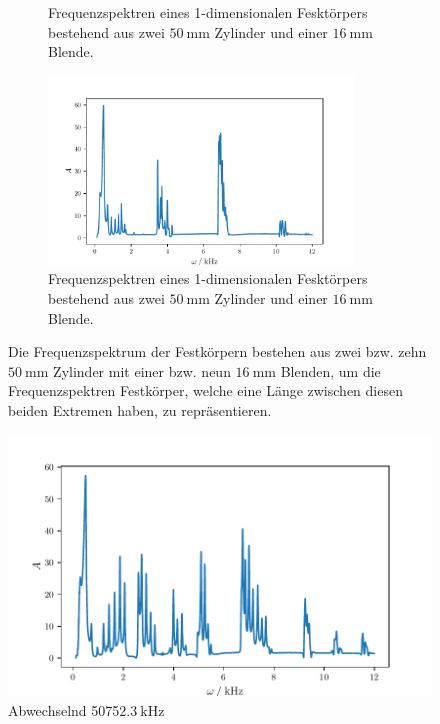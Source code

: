 \begin{figure}
\begin{subfigure}{0.48\textwidth}
        \caption{Frequenzspektren eines 1-dimensionalen Fesktörpers bestehend aus zwei $\qty{50}{\milli\meter}$ Zylinder und einer $\qty{16}{\milli\meter}$ Blende.}%
        \label{fig:10c9b625}
    \end{subfigure}%
    \hfill
    \begin{subfigure}{0.48\textwidth}%
        \centering%
        \includegraphics[height=5cm]{build/10c9b75.pdf}%
        \caption{Frequenzspektren eines 1-dimensionalen Fesktörpers bestehend aus zwei $\qty{50}{\milli\meter}$ Zylinder und einer $\qty{16}{\milli\meter}$ Blende.}%
        \label{fig:10c9b75}
    \end{subfigure}%
    \caption{Die Frequenzspektrum der Festkörpern bestehen aus zwei bzw. zehn $\qty{50}{\milli\meter}$ Zylinder mit einer bzw. neun $\qty{16}{\milli\meter}$ Blenden, um die 
            Frequenzspektren Festkörper, welche eine Länge zwischen diesen beiden Extremen haben, zu repräsentieren.}%
    \label{fig:austauschen}
\end{figure}%
\begin{figure}
    \centering
    \includegraphics{build/5075.pdf}
    \caption{Abwechselnd 5075$\qty{2.3}{\kilo\hertz}$}
    \label{pic:5075}
\end{figure}
